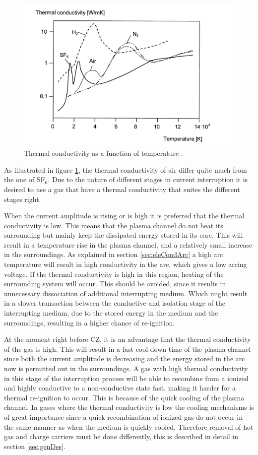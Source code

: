 \documentclass[10pt,a4paper,twoside]{article}
\begin{document}
\begin{figure}[H]
\centering
\includegraphics[scale=0.8]{Bilder/Theory/thermalCond.png}
\caption{Thermal conductivity as a function of temperature \cite{bib:HVEbreak}.} \label{fig:tempConGas}
\end{figure}

As illustrated in figure \ref{fig:tempConGas}, the thermal conductivity of air differ quite much from the one of SF$_6$. Due to the nature of different stages in current interruption it is desired to use a gas that have a thermal conductivity that suites the different stages right. 

When the current amplitude is rising or is high it is preferred that the thermal conductivity is low. This means that the plasma channel do not heat its surrounding but mainly keep the dissipated energy stored in its core. This will result in a temperature rise in the plasma channel, and a relatively small increase in the surroundings. As explained in section \ref{sec:eleCondArc} a high arc temperature will result in high conductivity in the arc, which gives a low arcing voltage. If the thermal conductivity is high in this region, heating of the surrounding system will occur. This should be avoided, since it results in unnecessary dissociation of additional interrupting medium. Which might result in a slower transaction between the conductive and isolation stage of the interrupting medium, due to the stored energy in the medium and the surroundings, resulting in a higher chance of re-ignition.

At the moment right before CZ, it is an advantage that the thermal conductivity of the gas is high. This will result in a fast cool-down time of the plasma channel since both the current amplitude is decreasing and the energy stored in the arc now is permitted out in the surroundings. A gas with high thermal conductivity in this stage of the interruption process will be able to recombine from a ionized and highly conductive to a non-conductive state fast, making it harder for a thermal re-ignition to occur. This is because of the quick cooling of the plasma channel. In gases where the thermal conductivity is low the cooling mechanisms is of great importance since a quick recombination of ionized gas do not occur in the same manner as when the medium is quickly cooled. Therefore removal of hot gas and charge carriers must be done differently, this is described in detail in section \ref{sec:genDes}.
\end{document}
